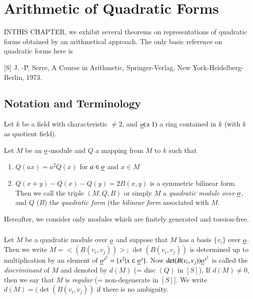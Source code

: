 
\chapter{Arithmetic of Quadratic Forms}\label{c2}

IN\pageoriginale THIS CHAPTER, we exhibit several theorems on
representations of quadratic forms obtained by an arithmetical
approach. The only basic reference on quadratic forms here is

[S] J. -P. Serre, A Course in Arithmetic, Springer-Verlag, New
York-Heidelberg- Berlin, 1973.

\setcounter{section}{-1}
\section{Notation and Terminology}\label{c2:sec-2.0}

Let $k$ be a field with characteristic $\neq 2$, and $\underline{o}(\ni 1)$ a
ring contained in $k$ (with $k$ as quotient field).

Let $M$ be an $\underline{o}$-module and $Q$ a mapping from $M$ to $k$ such
that
\begin{enumerate}
\renewcommand{\labelenumi}{(\theenumi)}
\item $Q(ax)=a^{2}Q(x)$ for $a\in\underline{o}$ and $x\in M$

\item $Q(x+y)-Q(x)-Q(y)=2B(x,y)$ is a symmetric bilinear form. Then we
  call the triple $(M,Q,B)$ or simply $M$ a {\em quadratic module over
    $\underline{o}$}, and $Q$ (\resp $B$) the {\em quadratic form} (\resp the
  {\em bilinear form} associated with $M$.
\end{enumerate}

Hereafter, we consider only modules which are finitely generated and
torsion-free.


\subsection{}\label{c2:subsec2.0.1}
Let $M$ be a quadratic module over $\underline{o}$ and suppose that
$M$ has a basis $\{v_{i}\}$ over $\underline{o}$. Then we write
$M=<(B(v_{i},v_{j}))>$; $\det (B(v_{i},v_{j}))$ is determined up to
multiplication by an element of
$\underline{o}^{x^{2}}=\{x^{2}|x\in\underline{o}^{x}\}$. Now
$\det(B(v_{i},v_{j}))\underline{o}^{x^{2}}$ is called the {\em discriminant}
of $M$ and denoted by $d(M)$ (= disc $(Q)$ in $[S]$). If $d(M)\neq 0$,
then we say that $M$ is {\em regular} (= non-degenerate\pageoriginale
in $[S]$]. We write $d(M)=(\det (B(v_{i},v_{j}))$ if there is no
  ambiguity.


